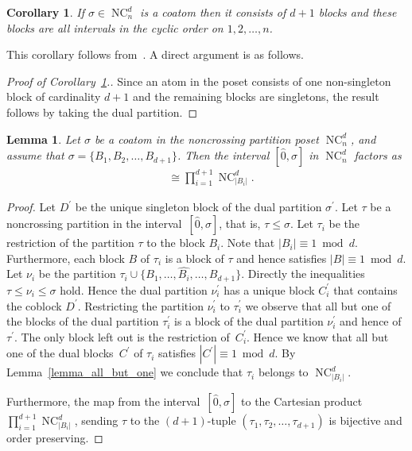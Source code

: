 \documentclass[11pt]{amsart}
\newtheorem{lemma}[theorem]{Lemma}
\newtheorem{corollary}[theorem]{Corollary}
\numberwithin{equation}{section}
\newcommand{\hz}{\widehat{0}}
\DeclareMathOperator{\NC}{NC}
\begin{document}
\begin{corollary}
If $\sigma\in\NC^{d}_{n}$ is a coatom then it consists of $d+1$ blocks
and these blocks are all intervals in the cyclic order on $1,2, \ldots, n$.
\label{corollary_coatom}
\end{corollary}
This corollary follows from~\cite[Corollary~2.3]{Muhle_Nadeau_Williams}.
A direct argument is as follows.
\begin{proof}[Proof of Corollary~\ref{corollary_coatom}.]
Since an atom in the poset consists of one non-singleton block of cardinality $d+1$
and the remaining blocks are singletons, the result follows by taking the dual partition.
\end{proof}

\begin{lemma}
Let  $\sigma$ be a coatom in the noncrossing partition poset $\NC^{d}_{n}$,
and assume that $\sigma = \{B_{1},B_{2}, \ldots, B_{d+1}\}$.
Then the interval $[\hz,\sigma]$ in $\NC^{d}_{n}$ factors as
\begin{align*}
[\hz,\sigma]
& \cong
\prod_{i=1}^{d+1} \NC^{d}_{|B_{i}|} .
\end{align*}
\label{lemma_one_small_step}
\end{lemma}
\begin{proof}
Let $D^{\prime}$ be the unique singleton block of the dual partition $\sigma^{\prime}$.
Let $\tau$ be a noncrossing partition in the interval~$[\hz,\sigma]$,
that is, $\tau \leq \sigma$.
Let $\tau_{i}$ be the restriction of the partition $\tau$ to the block $B_{i}$.
Note that $|B_{i}| \equiv 1 \bmod d$.
Furthermore, each block $B$ of $\tau_{i}$
is a block of $\tau$ and hence satisfies $|B| \equiv 1 \bmod d$.
Let $\nu_{i}$ be the partition
$\tau_{i} \cup \{B_{1}, \ldots, \widehat{B_{i}}, \ldots, B_{d+1}\}$.
Directly the inequalities $\tau \leq \nu_{i} \leq \sigma$ hold.
Hence the dual partition $\nu^{\prime}_{i}$ has a unique block $C^{\prime}_{i}$ that contains
the coblock $D^{\prime}$.
Restricting the partition $\nu^{\prime}_{i}$ to $\tau^{\prime}_{i}$
we observe that all but one of the blocks of the dual partition $\tau^{\prime}_{i}$
is a block of the dual partition $\nu^{\prime}_{i}$ and hence of $\tau^{\prime}$.
The only block left out is the restriction of~$C^{\prime}_{i}$.
Hence we know that all but one of the dual blocks~$C^{\prime}$ of $\tau_{i}$ satisfies  
$|C^{\prime}| \equiv 1 \bmod d$.
By Lemma~\ref{lemma_all_but_one}
we conclude that $\tau_{i}$ belongs to $\NC^{d}_{|B_{i}|}$.

Furthermore, the map from the interval~$[\hz,\sigma]$
to the Cartesian product $\prod_{i=1}^{d+1} \NC^{d}_{|B_{i}|}$,
sending $\tau$ to the $(d+1)$-tuple
$(\tau_{1},\tau_{2}, \ldots, \tau_{d+1})$ is bijective
and order preserving.
\end{proof}
\end{document}
